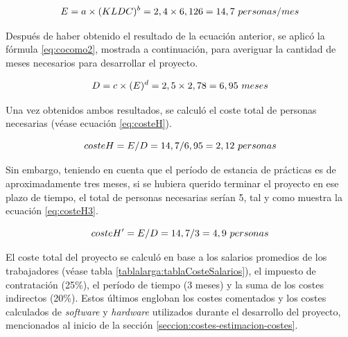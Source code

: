 \documentclass[pdftex,11pt,a4paper]{book}
\begin{document}
\vspace{-4mm}
\begin{equation}
E = a \times (KLDC) ^{b} = 2,4 \times 6,126 = 14,7 \textup{ }personas/mes
\label{eq:cocomo1}
\end{equation}

Después de haber obtenido el resultado de la ecuación anterior, se aplicó la fórmula \ref{eq:cocomo2}, mostrada a continuación, para averiguar la cantidad de meses necesarios para desarrollar el proyecto.

\vspace{-4mm}
\begin{equation}
D = c \times (E) ^{d} = 2,5 \times 2,78 = 6,95 \textup{ }meses
\label{eq:cocomo2}
\end{equation}

Una vez obtenidos ambos resultados, se calculó el coste total de personas necesarias (véase ecuación \ref{eq:costeH}).

\vspace{-4mm}
\begin{equation}
costeH = E / D = 14,7/6,95 = 2,12 \textup{ }personas
\label{eq:costeH}
\end{equation}

Sin embargo, teniendo en cuenta que el período de estancia de prácticas es de aproximadamente tres meses, si se hubiera querido terminar el proyecto en ese plazo de tiempo, el total de personas necesarias serían 5, tal y como muestra la ecuación \ref{eq:costeH3}.

\vspace{-4mm}
\begin{equation}
costeH' = E / D = 14,7/3 = 4,9 \textup{ }personas
\label{eq:costeH3}
\end{equation}

El coste total del proyecto se calculó en base a los salarios promedios de los trabajadores (véase tabla \ref{tablalarga:tablaCosteSalarios}), el impuesto de contratación (25\%), el período de tiempo (3 meses) y la suma de los costes indirectos (20\%). Estos últimos engloban los costes comentados y los costes calculados de \textit{software} y \textit{hardware} utilizados durante el desarrollo del proyecto, mencionados al inicio de la sección \ref{seccion:costes-estimacion-costes}.

\renewcommand{\tablename}{Tabla}

\renewcommand{\arraystretch}{1,7}
\end{document}
